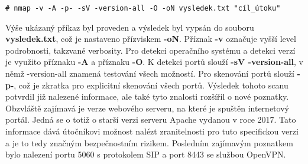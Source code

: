 \begin{codeblock}
	\begin{verbatim}
# nmap -v -A -p- -sV -version-all -O -oN vysledek.txt "cíl_útoku"
	\end{verbatim}
\end{codeblock}

Výše ukázaný příkaz byl proveden a výsledek byl vypsán do souboru \textbf{vysledek.txt}, což je nastaveno přízviskem \textbf{-oN}.
Příznak \textbf{-v} označuje vyšší level podrobnosti, takzvané verbosity.
Pro detekci operačního systému a detekci verzí je využito příznaku \textbf{-A} a příznaku \textbf{-O}.
K detekci portů slouží \textbf{-sV -version-all}, v němž -version-all znamená testování všech možností.
Pro skenování portů slouží \textbf{-p-}, což je zkratka pro explicitní skenování všech portů.
Výsledek tohoto scanu potvrdil již nalezené informace, ale také tyto znalosti rozšířil o nové poznatky.
Obzvláště zajímavá je verze webového serveru, na které je spuštěn internetový portál.
Jedná se o totiž o starší verzi serveru Apache vydanou v roce 2017.
Tato informace dává útočníkovi možnost nalézt zranitelnosti pro tuto specifickou verzi a je to tedy značným bezpečnostním rizikem.
Posledním zajímavým poznatkem bylo nalezení portu 5060 s protokolem SIP a port 8443 se službou OpenVPN\@.

